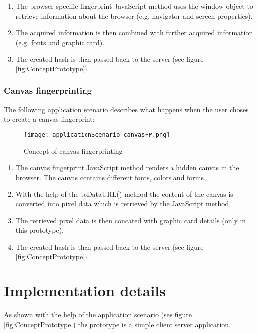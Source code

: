 \begin{enumerate}
	\item The browser specific fingerprint JavaScript method uses the window object to retrieve information about the browser (e.g. navigator and screen properties).
	\item The acquired information is then combined with further acquired information (e.g. fonts and graphic card).
	\item The created hash is then passed back to the server (see figure \ref{fig:ConceptPrototype}).\\
\end{enumerate}




\subsubsection{Canvas fingerprinting}\label{sec:appCanvas}
The following application scenario describes what happens when the user choses to create a canvas fingerprint:

\begin{figure}[H]
	\centering
	\texttt{[image: applicationScenario\_canvasFP.png]}
	\caption{Concept of canvas fingerprinting\\}
	\label{ConceptCanvasFingerprinting}
\end{figure}

\begin{enumerate}
	\item The canvas fingerprint JavaScript method renders a hidden canvas in the browser. The canvas contains different fonts, colors and forms.
	\item  With the help of the toDataURL() method the content of the canvas is converted into pixel data which is retrieved by the JavaScript method.
	\item The retrieved pixel data is then concated with graphic card details (only in this prototype).
	\item The created hash is then passed back to the server (see figure \ref{fig:ConceptPrototype}).\\
\end{enumerate}


\section{Implementation details}
As shown with the help of the application scenario (see figure \ref{fig:ConceptPrototype}) the prototype is a simple client server application. 


